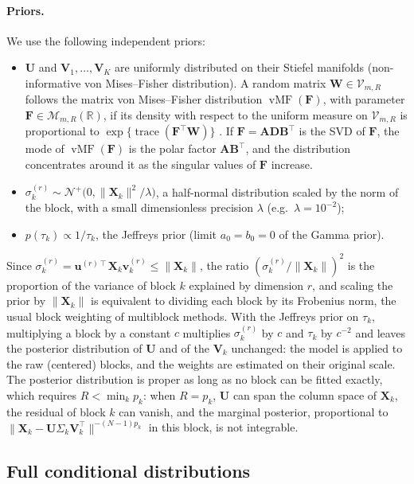 \documentclass[11pt]{article}
\DeclareMathOperator{\trace}{\mathrm{trace}}
\DeclareMathOperator{\vMF}{vMF}
\newcommand{\X}{\mathbf{X}}
\newcommand{\U}{\mathbf{U}}
\newcommand{\V}{\mathbf{V}}
\newcommand{\F}{\mathbf{F}}
\newcommand{\W}{\mathbf{W}}
\newcommand{\uu}{\mathbf{u}}
\newcommand{\vv}{\mathbf{v}}
\newcommand{\Stiefel}[2]{\mathcal V_{#1,#2}}
\begin{document}
\paragraph{Priors.} We use the following independent priors:
\begin{itemize}
  \item $\U$ and $\V_1,\ldots,\V_K$ are uniformly distributed on their Stiefel manifolds (non-informative von Mises--Fisher distribution). A random matrix $\W\in\Stiefel{m}{R}$ follows the matrix von Mises--Fisher distribution $\vMF(\F)$, with parameter $\F\in\mathcal M_{m,R}(\mathbb R)$, if its density with
respect to the uniform measure on $\Stiefel{m}{R}$ is proportional to $\exp\{\trace(\F^\intercal\W)\}$
\citep{hoff2009}. If $\F=\mathbf A\mathbf D\mathbf B^\intercal$ is the SVD of $\F$, the mode of $\vMF(\F)$ is the
polar factor $\mathbf A\mathbf B^\intercal$, and the distribution concentrates around it as the singular values of $\F$ increase.
  \item $\sigma_k^{(r)}\sim\mathcal N^+\bigl(0,\|\X_k\|^2/\lambda\bigr)$, a half-normal distribution scaled by the norm of the block, with a small dimensionless precision $\lambda$ (e.g.\ $\lambda=10^{-2}$);
  \item $p(\tau_k)\propto1/\tau_k$, the Jeffreys prior (limit $a_0=b_0=0$ of the Gamma prior).
\end{itemize}
Since $\sigma_k^{(r)}=\uu^{(r)\intercal}\X_k\vv_k^{(r)}\le\|\X_k\|$, the ratio $(\sigma_k^{(r)}/\|\X_k\|)^2$ is the proportion of the variance of block $k$ explained by dimension $r$, and scaling the prior by $\|\X_k\|$ is equivalent to dividing each block by its Frobenius norm, the usual block weighting of multiblock methods. With the Jeffreys prior on $\tau_k$, multiplying a block by a constant $c$ multiplies $\sigma_k^{(r)}$ by $c$ and $\tau_k$ by $c^{-2}$ and leaves the posterior distribution of $\U$ and of the $\V_k$ unchanged: the model is applied to the raw (centered) blocks, and the weights are estimated on their original scale. The posterior distribution is proper as long as no block can be fitted exactly, which requires $R<\min_kp_k$: when $R=p_k$, $\U$ can span the column space of $\X_k$, the residual of block $k$ can vanish, and the marginal posterior, proportional to $\|\X_k-\U\Sigma_k\V_k^\intercal\|^{-(N-1)p_k}$ in this block, is not integrable.

\subsection{Full conditional distributions}
\end{document}
